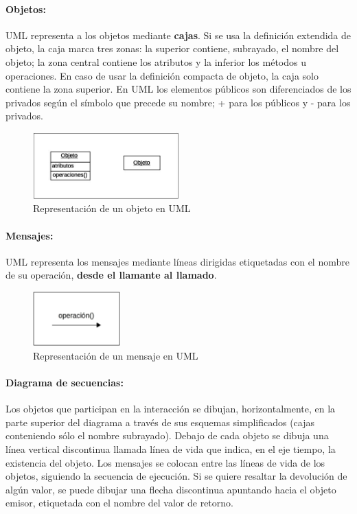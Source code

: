 \paragraph{Objetos:}
UML representa a los objetos mediante \textbf{cajas}. Si se usa la
definición extendida de objeto, la caja marca tres zonas: la superior
contiene, subrayado, el nombre del objeto; la zona central contiene
los atributos y la inferior los métodos u operaciones. En caso de usar
la definición compacta de objeto, la caja solo contiene la zona
superior. En UML los elementos públicos son diferenciados de los
privados según el símbolo que precede su nombre; \textrm{+} para los públicos
y \textrm{-} para los privados.

\begin{figure}[ht!]  \centering
\includegraphics[width=0.5\textwidth]{images/fig21}
  \caption{Representación de un objeto en UML}
  \label{fig:21}
\end{figure}

\vspace{5mm}

\paragraph{Mensajes:}
UML representa los mensajes mediante líneas dirigidas etiquetadas con
el nombre de su operación, \textbf{desde el llamante al llamado}.

\begin{figure}[ht!]  \centering
\includegraphics[width=0.3\textwidth]{images/fig22}
  \caption{Representación de un mensaje en UML}
  \label{fig:22}
\end{figure}

\paragraph{Diagrama de secuencias:}
Los objetos que participan en la interacción se dibujan,
horizontalmente, en la parte superior del diagrama a través de sus
esquemas simplificados (cajas conteniendo sólo el nombre
subrayado). Debajo de cada objeto se dibuja una línea vertical
discontinua llamada línea de vida que indica, en el eje tiempo, la
existencia del objeto.
Los mensajes se colocan entre las líneas de vida de los objetos,
siguiendo la secuencia de ejecución. Si se quiere resaltar la
devolución de algún valor, se puede dibujar una flecha discontinua
apuntando hacia el objeto emisor, etiquetada con el nombre del valor
de retorno.

